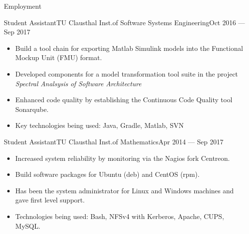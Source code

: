 \documentclass[]{mcdowellcv}
\begin{document}
\begin{cvsection}{Employment}
\begin{cvsubsection}{Student Assistant}{TU Clausthal Inst.\@ of Software Systems Engineering}{Oct 2016 --- Sep 2017}
\bigskip
\begin{itemize}
\item Build a tool chain for exporting Matlab Simulink models into the Functional Mockup Unit (FMU) format.
\item Developed components for a model transformation tool suite in the project \emph{Spectral Analsysis of Software Architecture}
\item Enhanced code quality by establishing the Continuous Code Quality tool Sonarqube.
\item Key technologies being used: Java, Gradle, Matlab, SVN
\end{itemize}
\end{cvsubsection}

\begin{cvsubsection}{Student Assistant}{TU Clausthal Inst.\@ of Mathematics}{Apr 2014 --- Sep 2017}
\bigskip
\begin{itemize}
\item Increased system reliability by monitoring via the Nagios fork Centreon.
\item Build software packages for Ubuntu (deb) and CentOS (rpm).
\item Has been the system administrator for Linux and Windows machines and gave first level support.
\item Technologies being used: Bash, NFSv4 with Kerberos, Apache, CUPS, MySQL.
\end{itemize}
\end{cvsubsection}

\end{cvsection}
\end{document}
